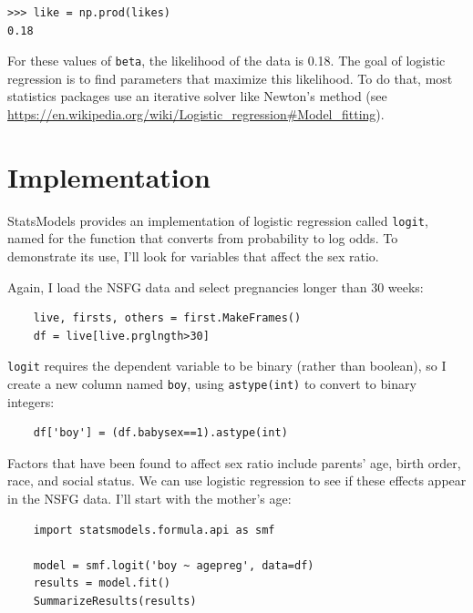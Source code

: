 \documentclass[12pt]{book}
\begin{document}
\begin{verbatim}
>>> like = np.prod(likes)
0.18
\end{verbatim}

For these values of \verb"beta", the likelihood of the data is 0.18.
The goal of logistic regression is to find parameters that maximize
this likelihood.  To do that, most statistics packages use an
iterative solver like Newton's method (see
\url{https://en.wikipedia.org/wiki/Logistic_regression#Model_fitting}).


\section{Implementation}
\label{implementation}

StatsModels provides an implementation of logistic regression
called \verb"logit", named for the function that converts from
probability to log odds.  To demonstrate its use, I'll look for
variables that affect the sex ratio.

Again, I load the NSFG data and select pregnancies longer than
30 weeks:

\begin{verbatim}
    live, firsts, others = first.MakeFrames()
    df = live[live.prglngth>30]
\end{verbatim}

\verb"logit" requires the dependent variable to be binary (rather than
boolean), so I create a new column named \verb"boy", using \verb"astype(int)"
to convert to binary integers:

\begin{verbatim}
    df['boy'] = (df.babysex==1).astype(int)
\end{verbatim}

Factors that have been found to affect sex ratio include parents'
age, birth order, race, and social status.  We can use logistic
regression to see if these effects appear in the NSFG data.  I'll
start with the mother's age:

\begin{verbatim}
    import statsmodels.formula.api as smf

    model = smf.logit('boy ~ agepreg', data=df)
    results = model.fit()
    SummarizeResults(results)
\end{verbatim}
\end{document}
